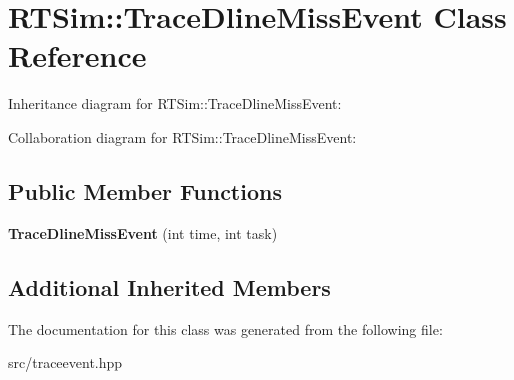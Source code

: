 \hypertarget{classRTSim_1_1TraceDlineMissEvent}{}\section{R\+T\+Sim\+:\+:Trace\+Dline\+Miss\+Event Class Reference}
\label{classRTSim_1_1TraceDlineMissEvent}


Inheritance diagram for R\+T\+Sim\+:\+:Trace\+Dline\+Miss\+Event\+:


Collaboration diagram for R\+T\+Sim\+:\+:Trace\+Dline\+Miss\+Event\+:
\subsection*{Public Member Functions}
\begin{DoxyCompactItemize}
\item 
{\bfseries Trace\+Dline\+Miss\+Event} (int time, int task)\hypertarget{classRTSim_1_1TraceDlineMissEvent_a0c9fffbd6b4e26c9c23bdad00c7b0a63}{}\label{classRTSim_1_1TraceDlineMissEvent_a0c9fffbd6b4e26c9c23bdad00c7b0a63}

\end{DoxyCompactItemize}
\subsection*{Additional Inherited Members}


The documentation for this class was generated from the following file\+:\begin{DoxyCompactItemize}
\item 
src/traceevent.\+hpp\end{DoxyCompactItemize}
